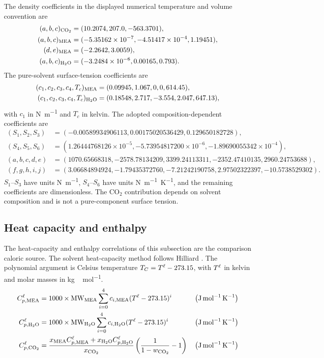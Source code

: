 The density coefficients in the displayed numerical temperature and volume convention are
\begin{align*}
(a,b,c)_{\COtwo}&=(10.2074,207.0,-563.3701),\\
(a,b,c)_{\MEA}&=(-5.35162\times10^{-7},-4.51417\times10^{-4},1.19451),\\
(d,e)_{\MEA}&=(-2.2642,3.0059),\\
(a,b,c)_{\HtwoO}&=(-3.2484\times10^{-6},0.00165,0.793).
\end{align*}
The pure-solvent surface-tension coefficients are
\begin{align*}
(c_1,c_2,c_3,c_4,T_c)_{\MEA}&=(0.09945,1.067,0,0,614.45),\\
(c_1,c_2,c_3,c_4,T_c)_{\HtwoO}&=(0.18548,2.717,-3.554,2.047,647.13),
\end{align*}
with $c_1$ in \unit{N.m^{-1}} and $T_c$ in kelvin.
The adopted composition-dependent coefficients are
\begin{align*}
(S_1,S_2,S_3)&=(-0.00589934906113,0.00175020536429,0.129650182728),\\
(S_4,S_5,S_6)&=(1.26444768126\times10^{-5},-5.73954817200\times10^{-6},-1.89690055342\times10^{-4}),\\
(a,b,c,d,e)&=(1070.65668318,-2578.78134209,3399.24113311,-2352.47410135,2960.24753688),\\
(f,g,h,i,j)&=(3.06684894924,-1.79435372760,-7.21242190758,2.97502322397,-10.5738529302).
\end{align*}
$S_1$--$S_3$ have units \unit{N.m^{-1}}, $S_4$--$S_6$ have units \unit{N.m^{-1}.K^{-1}}, and the remaining coefficients are dimensionless.
The CO$_2$ contribution depends on solvent composition and is not a pure-component surface tension.

\subsection{Heat capacity and enthalpy}
The heat-capacity and enthalpy correlations of this subsection are the comparison caloric source.
The solvent heat-capacity method follows Hilliard \cite{Hilliard2008}.
The polynomial argument is Celsius temperature $T_C=T^{\ell}-273.15$, with $T^{\ell}$ in kelvin and molar masses in \unit{kg\,mol^{-1}}.
\begin{align}
C^{\liq}_{p,\MEA} &= 1000 \times \text{MW}_{\MEA} \sum_{i=0}^{4} c_{i,\MEA}(T^{\liq}-273.15)^i
&& \left(\unit{J\,mol^{-1}\,K^{-1}}\right)\\
C^{\liq}_{p,\HtwoO} &= 1000 \times \text{MW}_{\HtwoO} \sum_{i=0}^{4} c_{i,\HtwoO}(T^{\liq}-273.15)^i
&& \left(\unit{J\,mol^{-1}\,K^{-1}}\right)\\
C^{\liq}_{p,\COtwo} &= \frac{x_{\MEA} C^{\liq}_{p,\MEA} + x_{\HtwoO} C^{\liq}_{p,\HtwoO}}{x_{\COtwo}} \left( \frac{1}{1 - w_{\COtwo}} - 1\right)
&& \left(\unit{J\,mol^{-1}\,K^{-1}}\right)
\end{align}



